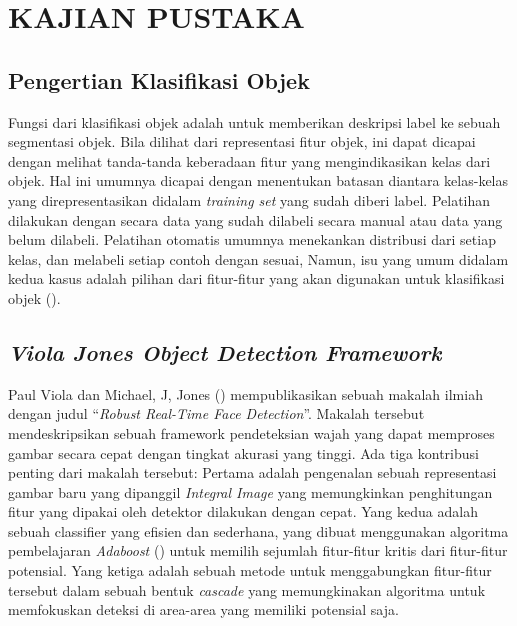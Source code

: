 
\chapter{KAJIAN PUSTAKA}

\section{Pengertian Klasifikasi Objek}

Fungsi dari klasifikasi objek adalah untuk memberikan deskripsi label ke 
sebuah segmentasi objek. Bila dilihat dari representasi fitur objek, ini 
dapat dicapai dengan melihat tanda-tanda keberadaan fitur yang mengindikasikan 
kelas dari objek. Hal ini umumnya dicapai dengan menentukan batasan diantara 
kelas-kelas yang direpresentasikan didalam \textit{training set} yang sudah diberi label. 
Pelatihan dilakukan dengan secara data yang sudah dilabeli secara manual atau 
data yang belum dilabeli. Pelatihan otomatis umumnya menekankan distribusi dari 
setiap kelas, dan melabeli setiap contoh dengan sesuai, Namun, isu yang umum 
didalam kedua kasus adalah pilihan dari fitur-fitur yang akan digunakan untuk 
klasifikasi objek (\cite{rennoetal}).

\section{\emph{Viola Jones Object Detection Framework}}

Paul Viola dan Michael, J, Jones (\cite{rennoetal}) mempublikasikan sebuah makalah ilmiah dengan 
judul “\emph{Robust Real-Time Face Detection}”. Makalah tersebut mendeskripsikan sebuah 
framework pendeteksian wajah yang dapat memproses gambar secara cepat dengan 
tingkat akurasi yang tinggi. Ada tiga kontribusi penting dari makalah tersebut: 
Pertama adalah pengenalan sebuah representasi gambar baru yang dipanggil 
\emph{Integral Image} yang memungkinkan penghitungan fitur yang dipakai oleh detektor 
dilakukan dengan cepat. Yang kedua adalah sebuah classifier yang efisien dan 
sederhana, yang dibuat menggunakan algoritma pembelajaran \emph{Adaboost} 
(\cite{freundetal}) untuk memilih sejumlah fitur-fitur kritis dari 
fitur-fitur potensial. Yang ketiga adalah sebuah metode untuk menggabungkan 
fitur-fitur tersebut dalam sebuah bentuk \emph{cascade} yang memungkinakan algoritma 
untuk memfokuskan deteksi di area-area yang memiliki potensial saja.

